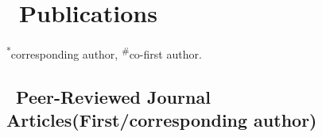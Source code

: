 \newcommand{\Revision}{\textit{under revision}}
\newcommand{\Review}{\textit{under review}}
\newcommand{\Submitted}{\textit{submitted}}
\newcommand{\CS}{\textsuperscript{*}} %
\newcommand{\CF}{\textsuperscript{\#}} %

\section{\texorpdfstring{\faBook\ Publications}{Publications}}
\CS corresponding author, \CF co-first author.

\subsection*{\texorpdfstring{\faBook\ Peer-Reviewed Journal Articles(First/corresponding author)}{Peer-Reviewed Journal Articles(First/corresponding author)}}
